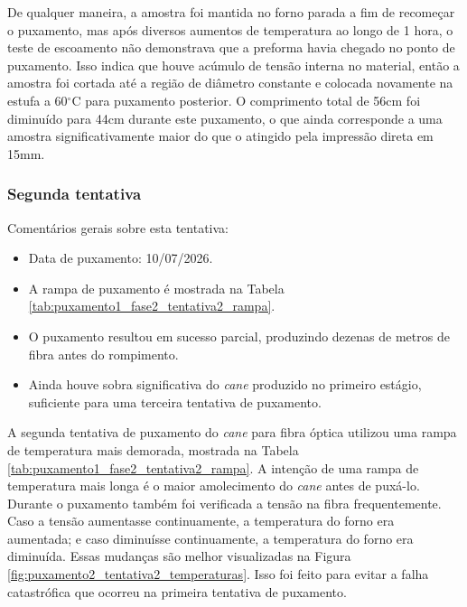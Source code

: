 \documentclass[12pt,a4paper]{article}
\begin{document}
  De qualquer maneira, a amostra foi mantida no forno parada a fim de recomeçar o puxamento, mas após diversos aumentos de temperatura ao longo de 1 hora, o teste de escoamento não demonstrava que a preforma havia chegado no ponto de puxamento.
  Isso indica que houve acúmulo de tensão interna no material, então a amostra foi cortada até a região de diâmetro constante e colocada novamente na estufa a 60$^\circ$C para puxamento posterior.
  O comprimento total de 56cm foi diminuído para 44cm durante este puxamento, o que ainda corresponde a uma amostra significativamente maior do que o atingido pela impressão direta em 15mm.

  \subsubsection{Segunda tentativa}
  \label{subsubsec:puxamento2_tentativa2}

  Comentários gerais sobre esta tentativa:
  \begin{itemize}
    \item Data de puxamento: 10/07/2026.
    \item A rampa de puxamento é mostrada na Tabela \ref{tab:puxamento1_fase2_tentativa2_rampa}.
    \item O puxamento resultou em sucesso parcial, produzindo dezenas de metros de fibra antes do rompimento.
    \item Ainda houve sobra significativa do \textit{cane} produzido no primeiro estágio, suficiente para uma terceira tentativa de puxamento.
  \end{itemize}

  A segunda tentativa de puxamento do \textit{cane} para fibra óptica utilizou uma rampa de temperatura mais demorada, mostrada na Tabela \ref{tab:puxamento1_fase2_tentativa2_rampa}.
  A intenção de uma rampa de temperatura mais longa é o maior amolecimento do \textit{cane} antes de puxá-lo.
  Durante o puxamento também foi verificada a tensão na fibra frequentemente.
  Caso a tensão aumentasse continuamente, a temperatura do forno era aumentada; e caso diminuísse continuamente, a temperatura do forno era diminuída.
  Essas mudanças são melhor visualizadas na Figura \ref{fig:puxamento2_tentativa2_temperaturas}.
  Isso foi feito para evitar a falha catastrófica que ocorreu na primeira tentativa de puxamento.
\end{document}
